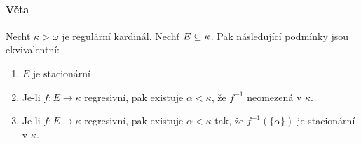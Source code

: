 \documentclass[a4paper,12pt,titlepage]{article}
\begin{document}
\paragraph{Věta}
Nechť $\kappa > \omega$ je regulární kardinál. Nechť $E \subseteq \kappa$. Pak
následující podmínky jsou ekvivalentní:
\begin{enumerate}
	\item $E$ je stacionární
	\item Je-li $f: E \to \kappa$ regresivní, pak existuje $\alpha < \kappa$, že
	$f^{-1}$ neomezená v $\kappa$.
	\item Je-li $f: E \to \kappa$ regresivní, pak existuje $\alpha < \kappa$
	tak, že $f^{-1} (\{\alpha\})$ je stacionární v $\kappa$.
\end{enumerate}
\end{document}
